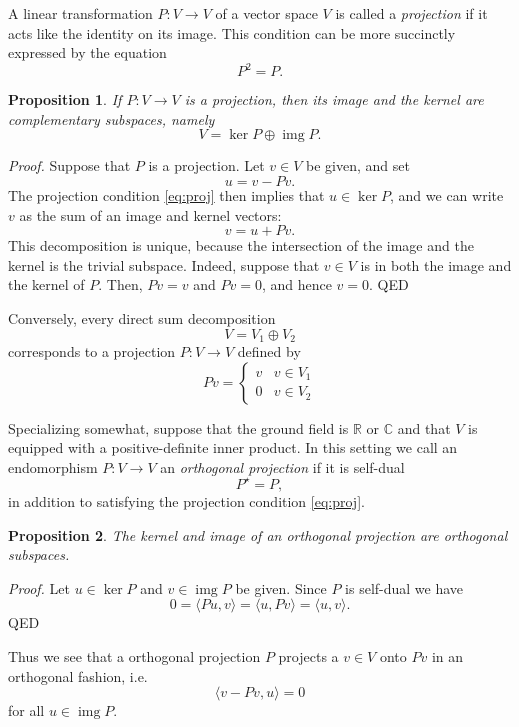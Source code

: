 \documentclass[12pt]{article}
\newcommand{\reals}{\mathbb{R}}
\newcommand{\cnums}{\mathbb{C}}
\newtheorem{proposition}{Proposition}
\newcommand{\adj}{^{\displaystyle \star}}
\newcommand{\img}{\mathop{\mathrm{img}}\nolimits}
\begin{document}
A linear transformation $P:V\rightarrow V$ of a vector space $V$ is called a
\emph{projection} if it acts like the identity on its image. This
condition can be more succinctly expressed by the equation
\begin{equation}
  \label{eq:proj}
  P^2 = P.  
\end{equation}
\begin{proposition}
  If $P:V\rightarrow V$ is a projection, then
  its image and the kernel are complementary subspaces, namely
  \begin{equation}
    \label{eq:comp}
    V = \ker P \oplus \img P.
  \end{equation}
\end{proposition}
\emph{Proof. }
  Suppose that $P$ is a projection.  Let $v\in V$ be given, and set 
  $$u=v-Pv.$$
  The projection condition \eqref{eq:proj} then implies
  that $u\in \ker P$, and we can write $v$ as the sum of an image and
  kernel vectors:
  $$v = u + Pv.$$
  This decomposition is unique, because the
  intersection of the image and the kernel is the trivial subspace.
  Indeed, suppose that $v\in V$ is in both the image and the kernel of $P$.
  Then, $Pv=v$ and $Pv=0$, and hence $v=0$. QED


Conversely, every direct sum decomposition
$$V = V_1 \oplus V_2$$
corresponds to a projection $P:V\rightarrow V$ defined by
$$
Pv =\begin{cases}
v & v\in V_1 \\
0 & v\in V_2
\end{cases}$$

Specializing somewhat, suppose that the ground field is $\reals$ or
$\cnums$ and that $V$ is equipped with a positive-definite inner
product.  In this setting we call an endomorphism
$P:V\rightarrow V$ an \emph{orthogonal projection} if it is self-dual
$$P\adj = P,$$
in addition to  satisfying the projection condition \eqref{eq:proj}.
\begin{proposition}
  The kernel and image of an orthogonal projection are orthogonal subspaces.
\end{proposition}
\emph{Proof. }
  Let $u\in\ker P$ and $v\in \img P$ be given.  Since $P$
  is self-dual we have
  $$0 = \langle Pu,v\rangle = \langle u,Pv\rangle = \langle
  u,v\rangle.$$
QED

Thus we see that a orthogonal projection $P$ projects a $v \in V$ onto
$Pv$ in an orthogonal fashion, i.e.
$$\langle v-Pv,u\rangle = 0$$
for all $u\in \img P$.
\end{document}
